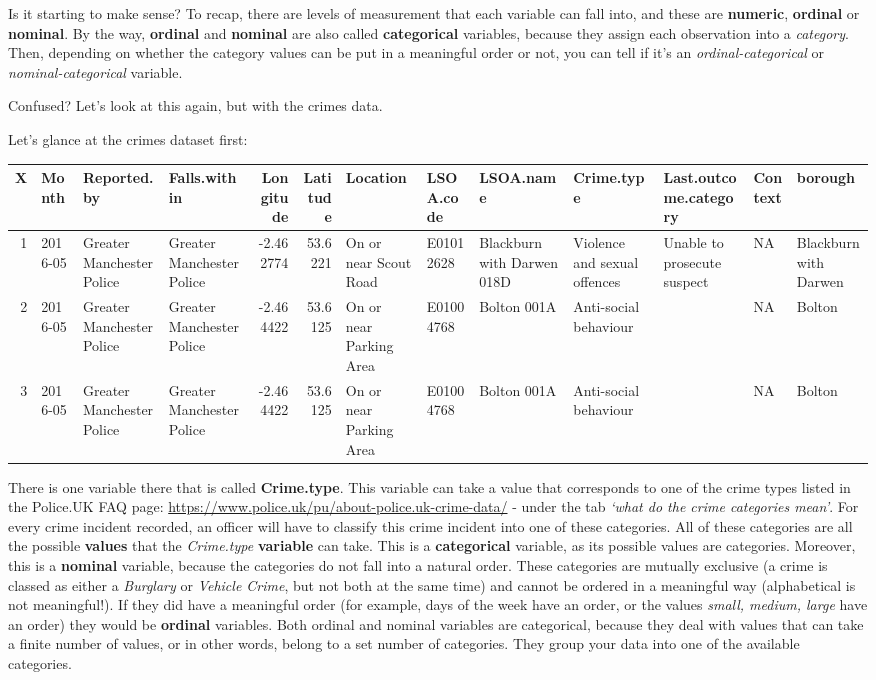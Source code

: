 \documentclass[
]{book}
\begin{document}
Is it starting to make sense? To recap, there are levels of measurement that each variable can fall into, and these are \textbf{numeric}, \textbf{ordinal} or \textbf{nominal}. By the way, \textbf{ordinal} and \textbf{nominal} are also called \textbf{categorical} variables, because they assign each observation into a \emph{category}. Then, depending on whether the category values can be put in a meaningful order or not, you can tell if it's an \emph{ordinal-categorical} or \emph{nominal-categorical} variable.

Confused? Let's look at this again, but with the crimes data.

Let's glance at the crimes dataset first:

\begin{tabular}{r|l|l|l|r|r|l|l|l|l|l|l|l}
\hline
X & Month & Reported.by & Falls.within & Longitude & Latitude & Location & LSOA.code & LSOA.name & Crime.type & Last.outcome.category & Context & borough\\
\hline
1 & 2016-05 & Greater Manchester Police & Greater Manchester Police & -2.462774 & 53.6221 & On or near Scout Road & E01012628 & Blackburn with Darwen 018D & Violence and sexual offences & Unable to prosecute suspect & NA & Blackburn with Darwen\\
\hline
2 & 2016-05 & Greater Manchester Police & Greater Manchester Police & -2.464422 & 53.6125 & On or near Parking Area & E01004768 & Bolton 001A & Anti-social behaviour &  & NA & Bolton\\
\hline
3 & 2016-05 & Greater Manchester Police & Greater Manchester Police & -2.464422 & 53.6125 & On or near Parking Area & E01004768 & Bolton 001A & Anti-social behaviour &  & NA & Bolton\\
\hline
\end{tabular}

There is one variable there that is called \textbf{Crime.type}. This variable can take a value that corresponds to one of the crime types listed in the Police.UK FAQ page: \url{https://www.police.uk/pu/about-police.uk-crime-data/} - under the tab \emph{`what do the crime categories mean'}. For every crime incident recorded, an officer will have to classify this crime incident into one of these categories. All of these categories are all the possible \textbf{values} that the \emph{Crime.type} \textbf{variable} can take. This is a \textbf{categorical} variable, as its possible values are categories. Moreover, this is a \textbf{nominal} variable, because the categories do not fall into a natural order. These categories are mutually exclusive (a crime is classed as either a \emph{Burglary} or \emph{Vehicle Crime}, but not both at the same time) and cannot be ordered in a meaningful way (alphabetical is not meaningful!). If they did have a meaningful order (for example, days of the week have an order, or the values \emph{small, medium, large} have an order) they would be \textbf{ordinal} variables. Both ordinal and nominal variables are categorical, because they deal with values that can take a finite number of values, or in other words, belong to a set number of categories. They group your data into one of the available categories.
\end{document}
